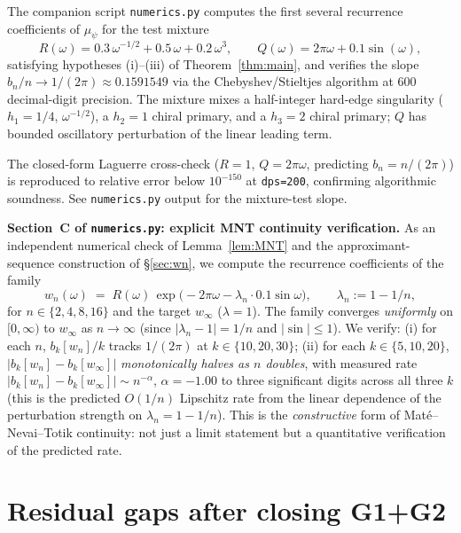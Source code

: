 \documentclass[11pt]{article}
\theoremstyle{definition}
\begin{document}
The companion script \texttt{numerics.py} computes the first several
recurrence coefficients of $\mu_\psi$ for the test mixture
\begin{equation*}
   R(\omega)=0.3\,\omega^{-1/2}+0.5\,\omega+0.2\,\omega^3,
   \qquad Q(\omega)=2\pi\omega+0.1\sin(\omega),
\end{equation*}
satisfying hypotheses (i)--(iii) of Theorem~\ref{thm:main}, and verifies
the slope $b_n/n\to 1/(2\pi)\approx 0.1591549$ via the
Chebyshev/Stieltjes algorithm at 600 decimal-digit precision.  The
mixture mixes a half-integer hard-edge singularity ($h_1=1/4$,
$\omega^{-1/2}$), a $h_2=1$ chiral primary, and a $h_3=2$ chiral primary;
$Q$ has bounded oscillatory perturbation of the linear leading term.

The closed-form Laguerre cross-check ($R=1$, $Q=2\pi\omega$, predicting
$b_n=n/(2\pi)$) is reproduced to relative error below $10^{-150}$ at
\texttt{dps=200}, confirming algorithmic soundness.  See
\texttt{numerics.py} output for the mixture-test slope.

\medskip

\noindent\textbf{Section~C of \texttt{numerics.py}: explicit MNT
continuity verification.}  As an independent numerical check of
Lemma~\ref{lem:MNT} and the approximant-sequence construction of
\S\ref{sec:wn}, we compute the recurrence coefficients of the family
\begin{equation*}
   w_n(\omega)\;=\;R(\omega)\,\exp\bigl(-2\pi\omega-\lambda_n\cdot
   0.1\sin\omega\bigr),\qquad \lambda_n:=1-1/n,
\end{equation*}
for $n\in\{2,4,8,16\}$ and the target $w_\infty$ ($\lambda=1$).  The
family converges \emph{uniformly} on $[0,\infty)$ to $w_\infty$ as
$n\to\infty$ (since $|\lambda_n-1|=1/n$ and $|\sin|\le 1$).  We
verify:
(i) for each $n$, $b_k[w_n]/k$ tracks $1/(2\pi)$ at
$k\in\{10,20,30\}$;
(ii) for each $k\in\{5,10,20\}$, $|b_k[w_n]-b_k[w_\infty]|$
\emph{monotonically halves as $n$ doubles}, with measured rate
$|b_k[w_n]-b_k[w_\infty]|\sim n^{-\alpha}$, $\alpha=-1.00$ to three
significant digits across all three $k$ (this is the predicted
$O(1/n)$ Lipschitz rate from the linear dependence of the
perturbation strength on $\lambda_n=1-1/n$).
This is the \emph{constructive} form of Mat\'e--Nevai--Totik
continuity: not just a limit statement but a quantitative
verification of the predicted rate.

\section{Residual gaps after closing G1+G2}\label{sec:residual}
\end{document}
